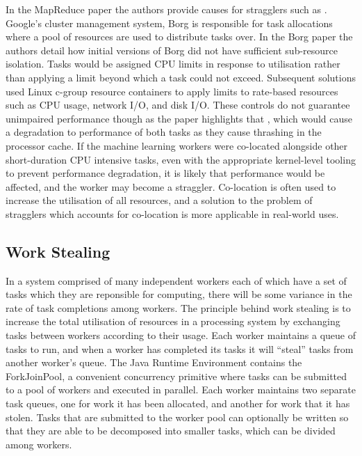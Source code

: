 \documentclass[12pt]{article}
\begin{document}
In the MapReduce paper \citep{dean2008mapreduce} the authors provide causes for stragglers such as . Google's cluster management system, Borg \cite{43438} is responsible for task allocations where a pool of resources are used to distribute tasks over. In the Borg paper the authors detail how initial versions of Borg did not have sufficient sub-resource isolation. Tasks would be assigned CPU limits in response to utilisation rather than applying a limit beyond which a task could not exceed. Subsequent solutions used Linux c-group resource containers to apply limits to rate-based resources such as CPU usage, network I/O, and disk I/O. These controls do not guarantee unimpaired performance though as the paper highlights that , which would cause a degradation to performance of both tasks as they cause thrashing in the processor cache.
\newline
\newline
If the machine learning workers were co-located alongside other short-duration CPU intensive tasks, even with the appropriate kernel-level tooling to prevent performance degradation, it is likely that performance would be affected, and the worker may become a straggler. Co-location is often used to increase the utilisation of all resources, and a solution to the problem of stragglers which accounts for co-location is more applicable in real-world uses.

\subsection{Work Stealing}

In a system comprised of many independent workers each of which have a set of tasks which they are reponsible for computing, there will be some variance in the rate of task completions among workers.
\newline
\newline
The principle behind work stealing is to increase the total utilisation of resources in a processing system by exchanging tasks between workers according to their usage. Each worker maintains a queue of tasks to run, and when a worker has completed its tasks it will ``steal'' tasks from another worker's queue.
\newline
\newline
The Java Runtime Environment contains the ForkJoinPool\cite{javaThreads}, a convenient concurrency primitive where tasks can be submitted to a pool of workers and executed in parallel. Each worker maintains two separate task queues, one for work it has been allocated, and another for work that it has stolen. Tasks that are submitted to the worker pool can optionally be written so that they are able to be decomposed into smaller tasks, which can be divided among workers.
\newline
\end{document}
